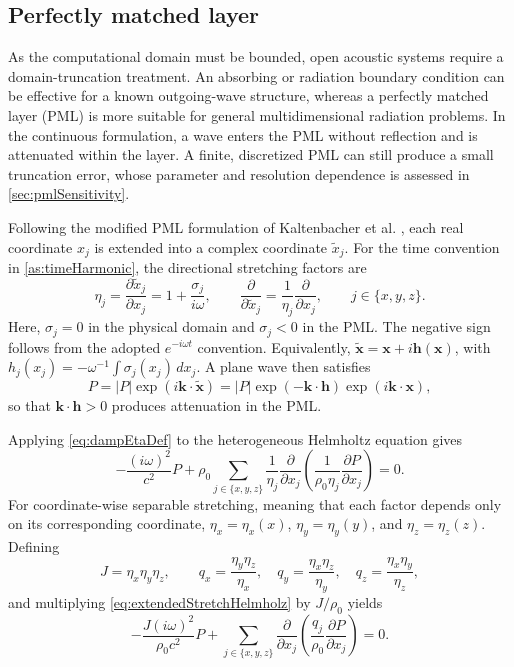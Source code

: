 \documentclass[final,12pt,nopreprintline,longtitle]{elsarticle}
\newcommand{\x}{\mathbf{x}}
\renewcommand{\k}{\mathbf{k}}
\newcommand{\h}{\boldsymbol{h}}
\begin{document}
\subsection{Perfectly matched layer}
As the computational domain must be bounded, open acoustic systems require a
domain-truncation treatment.  An absorbing or radiation boundary condition can
be effective for a known outgoing-wave structure, whereas a perfectly matched
layer (PML) is more suitable for general multidimensional radiation problems.
In the continuous formulation, a wave enters the PML without reflection and is
attenuated within the layer.  A finite, discretized PML can still produce a
small truncation error, whose parameter and resolution dependence is assessed in
\cref{sec:pmlSensitivity}.

Following the modified PML formulation of Kaltenbacher et al.
\cite{Kaltenbacher2013modified}, each real coordinate $x_j$ is extended into a
complex coordinate $\tilde{x}_j$.  For the time convention in
\cref{as:timeHarmonic}, the directional stretching factors are
\begin{equation}
    \eta_j
    =\frac{\partial\tilde{x}_j}{\partial x_j}
    =1+\frac{\sigma_j}{i\omega},
    \qquad
    \frac{\partial}{\partial\tilde{x}_j}
    =\frac{1}{\eta_j}\frac{\partial}{\partial x_j},
    \qquad j\in\{x,y,z\}.
    \label{eq:dampEtaDef}
\end{equation}
Here, $\sigma_j=0$ in the physical domain and $\sigma_j<0$ in the PML.  The
negative sign follows from the adopted $e^{-i\omega t}$ convention.  Equivalently,
$\tilde{\x}=\x+i\h(\x)$, with
$h_j(x_j)=-\omega^{-1}\int\sigma_j(x_j)\,dx_j$.  A plane wave then satisfies
\begin{equation}
    P=|P|\exp(i\k\cdot\tilde{\x})
     =|P|\exp(-\k\cdot\h)\exp(i\k\cdot\x),
    \label{eq:planeWaveDamp}
\end{equation}
so that $\k\cdot\h>0$ produces attenuation in the PML.

Applying \cref{eq:dampEtaDef} to the heterogeneous Helmholtz equation gives
\begin{equation}
    -\frac{(i\omega)^2}{c^2}P
    +\rho_0\sum_{j\in\{x,y,z\}}
    \frac{1}{\eta_j}\frac{\partial}{\partial x_j}
    \left(
        \frac{1}{\rho_0\eta_j}
        \frac{\partial P}{\partial x_j}
    \right)=0.
    \label{eq:extendedStretchHelmholz}
\end{equation}
For coordinate-wise separable stretching, meaning that each factor depends
only on its corresponding coordinate,
$\eta_x=\eta_x(x)$, $\eta_y=\eta_y(y)$, and $\eta_z=\eta_z(z)$.  Defining
\begin{equation}
    J=\eta_x\eta_y\eta_z,
    \qquad
    q_x=\frac{\eta_y\eta_z}{\eta_x},\quad
    q_y=\frac{\eta_x\eta_z}{\eta_y},\quad
    q_z=\frac{\eta_x\eta_y}{\eta_z},
    \label{eq:pmlJacobianRatios}
\end{equation}
and multiplying \cref{eq:extendedStretchHelmholz} by $J/\rho_0$ yields
\begin{equation}
    -\frac{J(i\omega)^2}{\rho_0c^2}P
    +\sum_{j\in\{x,y,z\}}
    \frac{\partial}{\partial x_j}
    \left(
        \frac{q_j}{\rho_0}
        \frac{\partial P}{\partial x_j}
    \right)=0.
    \label{eq:reformedStretchHelmholz}
\end{equation}
\end{document}
